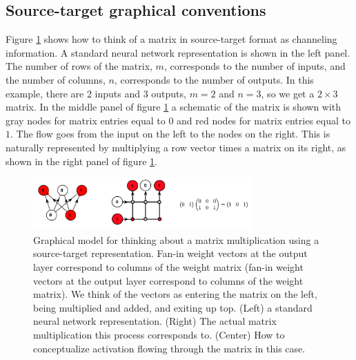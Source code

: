 \subsection{Source-target graphical conventions}

   Figure \ref{sourceTargetConvention} shows how to think of a matrix in 
source-target format as channeling information. A standard neural network representation is shown in
the left panel. The number of rows of the matrix, $m$, corresponds to the 
number of inputs, and the number of columns, $n$, corresponds to the number of 
outputs. In this example, there are 2 inputs and 3 outputs, $m=2$ and $n=3$, 
so we get a $2 \times 3$ matrix. In the middle panel of figure 
\ref{sourceTargetConvention} a schematic of the matrix is shown with gray nodes 
for matrix entries equal to $0$ and red nodes for matrix entries equal to $1$.
The flow goes from the input on the left to the nodes on the right. This is 
naturally represented by multiplying a row vector times a matrix on its right,
as shown in the right panel of figure \ref{sourceTargetConvention}. 


\begin{figure}[h]
\centering
\includegraphics[width=0.75\textwidth]{images/sourceTarget.png}
\caption[Jeff Yoshimi.]{Graphical model for thinking about a matrix multiplication using a source-target representation. Fan-in weight vectors at the output layer correspond to columns of the weight matrix (fan-in weight vectors at the output layer correspond to columns of the weight matrix). We think of the vectors as entering the matrix on the left, being multiplied and added, and exiting up top. (Left) a standard neural network representation. (Right) The actual matrix multiplication this process corresponds to. (Center) How to conceptualize activation flowing through the matrix in this case. }
\label{sourceTargetConvention}
\end{figure}

